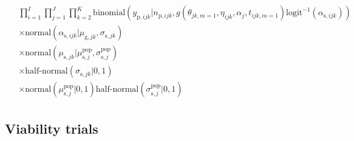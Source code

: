 \documentclass[12pt, oneside, titlepage]{article}   	%
\begin{document}
\begin{align}
\begin{split}
  \\ & \prod_{i=1}^{I} \prod_{j=1}^{J} \prod_{k=2}^{K} \mathrm{binomial} ( y_{\mathrm{p},ijk} | n_{\mathrm{p},ijk}, g( \theta_{jk,m=1}, \eta_{ijk}, \alpha_j , t_{ijk,m=1} )  \mathrm{logit}^{-1}(\alpha_{\mathrm{s},ijk})  )
             \\ & \times \mathrm{normal} ( \alpha_{\mathrm{s},ijk}  | \mu_{\mathrm{g},jk}, \sigma{_{\mathrm{s},jk} })
  \\ & \times \mathrm{normal} ( \mu_{\mathrm{s},jk}  | \mu^\mathrm{pop}_{\mathrm{s},j}, \sigma^\mathrm{pop}_{\mathrm{s},j} )
  \\ & \times \textrm{half-normal} ( \sigma_{\mathrm{s},jk} | 0,1)
  \\ & \times \mathrm{normal} ( \mu^\mathrm{pop}_{\mathrm{s},j} | 0 , 1 ) \textrm{half-normal} ( \sigma^\mathrm{pop}_{\mathrm{s},j} | 0,1)
  \end{split}
\end{align}

\clearpage
\newpage

\subsection*{Viability trials}

\end{document}
